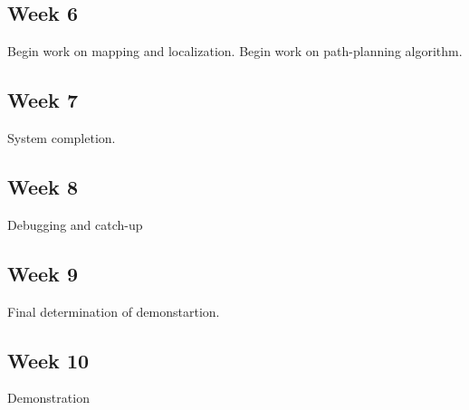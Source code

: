 \documentclass[a4paper,12pt]{article}
\begin{document}
\subsection{Week 6}
Begin work on mapping and localization.
Begin work on path-planning algorithm.

\subsection{Week 7}
System completion.

\subsection{Week 8}
Debugging and catch-up

\subsection{Week 9}
Final determination of demonstartion.

\subsection{Week 10}
Demonstration
\end{document}
